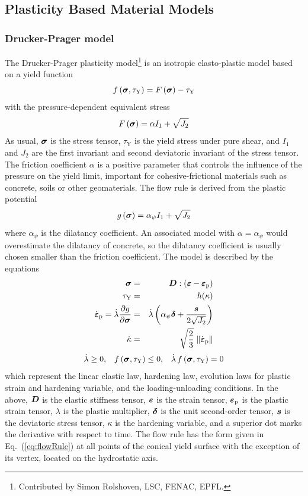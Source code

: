 \documentclass[epsf,a4paper]{article}
\newcommand{\mbf}[1]{\mbox{\boldmath$#1$}}
\newcommand{\be}{\begin{equation}}
\newcommand{\ee}{\end{equation}}
\newcommand {\bea}{\begin{eqnarray}}
\newcommand {\eea}{\end{eqnarray}}
\newcommand {\bsig}{\mbf{\sigma}}
\newcommand {\alphaPsi}{\alpha_{\psi}}
\newcommand {\tauY}{\tau_{\mathrm {Y}}}
\newcommand {\eps} {\mbf{\varepsilon}}
\newcommand {\epsp} {\eps_{\mathrm{p}}}
\newcommand {\epspd} {\dot{\eps}_{\mathrm{p}}}
\begin{document}
\subsection{Plasticity Based Material Models}

\subsubsection{Drucker-Prager model}
The Drucker-Prager plasticity model\footnote{Contributed by Simon Rolshoven, LSC, FENAC, EPFL.} is an isotropic elasto-plastic model based
on a yield function
\be
f \left(\bsig, \tauY\right) = F\left(\bsig\right) - \tauY
\ee
with the pressure-dependent equivalent stress
\be
\label{eq:equivalentStress}
F\left(\bsig\right) = \alpha I_1 + \sqrt{J_2}
\ee
As usual, $\bsig$ is the stress tensor, $\tauY$ is the yield stress
under pure shear, and $I_1$ and $J_2$ are the first invariant and second
deviatoric invariant of the stress tensor. 
The friction coefficient $\alpha$ is a positive parameter that
controls the influence of the pressure on the yield limit, important for
cohesive-frictional materials such as concrete, soils or other
geomaterials. 
The flow rule is derived from the plastic potential
\be
g\left(\bsig\right) = \alphaPsi I_1 + \sqrt{J_2}
\ee
where $\alphaPsi$ is the dilatancy coefficient. An associated
model with $\alpha=\alphaPsi$ would overestimate the dilatancy of
concrete, so the dilatancy coefficient is usually chosen smaller than the
friction coefficient.
The model is described by the equations
\bea
\label{eq:elasticLaw}
\bsig & = &\mbf{D} : \left(\eps - \epsp \right)
\\
\label{eq:softeningLaw}
\tauY & = & h(\kappa)
\\
\label{eq:flowRule}
\epspd = \dot{\lambda} \frac{\partial g}{\partial \bsig} & = &
\dot{\lambda} \left( \alphaPsi \mbf{\delta} + \frac{\mbf{s}}{2\sqrt{J_2}} \right)
\\
\label{eq:hardening}
\dot{\kappa} & = & \sqrt{\frac{2}{3}} \; \| \epspd \|
\eea
\be
\label{eq:loading}
\dot{\lambda} \ge 0, \;\;\; f \left(\bsig, \tauY\right) \le 0, \;\;\; \dot{\lambda}\, f \left(\bsig, \tauY\right)  = 0
\ee
which represent the linear elastic law, hardening law, evolution laws
for plastic strain and hardening variable,  and the 
loading-unloading conditions. 
In the above, $\mbf{D}$ is the elastic stiffness
tensor, $\eps$ is the strain tensor, $\epsp$ is the plastic strain tensor,
$\lambda$ is the plastic multiplier, $\mbf{\delta}$ is the unit
second-order tensor, $\mbf{s}$ is the 
deviatoric stress tensor, $\kappa$ is the hardening variable, and a
superior dot marks the derivative with respect to time. 
The flow rule has the form given in Eq.~(\ref{eq:flowRule}) at all
points of the conical yield surface with the exception of its vertex,
located on the hydrostatic axis.
\end{document}
